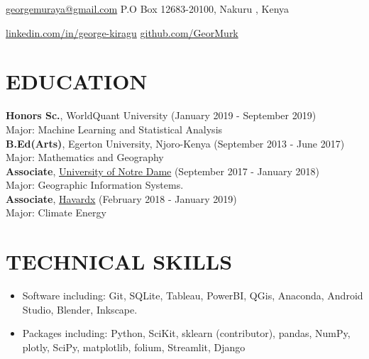 \documentclass[line,margin,10pt]{res}
\begin{document}
 
\begin{resume}
\hoffset\centerline 
{\href{mailto:georgemuraya@gmail.com}{georgemuraya@gmail.com} \quad \quad \quad \quad \quad \quad \quad \quad \quad \quad \quad\quad \quad \quad \quad \quad \quad \quad \quad \quad \quad \quad  \quad    P.O Box 12683-20100, Nakuru , Kenya}
\hoffset\centerline 
{\hspace{0.05cm} \href{https://linkedin.com/in/george-kiragu}{linkedin.com/in/george-kiragu} \quad \quad \quad \quad \quad \quad \quad \quad \quad \quad \quad\quad \quad \quad \quad \quad \quad \quad \quad \quad \quad \quad  \quad \quad \quad  \quad \quad \quad   \quad \href{https://github.com/GeorMurk}{github.com/GeorMurk}}
 
{\vspace{-0.25cm}}

\section{EDUCATION} 
\textbf{Honors Sc.}, WorldQuant University \hfill (January 2019 - September 2019)\\
Major: Machine Learning and Statistical Analysis \\
\textbf{B.Ed(Arts)}, Egerton University, Njoro-Kenya \hfill (September 2013 - June 2017)\\
Major: Mathematics and Geography \\ 
\textbf{Associate}, \href{https://edge.edx.org/courses/course-v1:NotreDame+GIS000+0000/courseware}{University of Notre Dame} \hfill (September 2017 - January 2018)\\
Major: Geographic Information Systems. \\
\textbf{Associate}, \href{https://courses.edx.org/courses/course-v1:HarvardX+SPU29x+3T2016/course/}{Havardx} \hfill (February 2018 - January 2019)\\
Major: Climate Energy \\

\section{TECHNICAL SKILLS} 
\begin{itemize}[leftmargin=-2pt] \itemsep -2pt
\item [] Software including: Git, SQLite, Tableau, PowerBI, QGis, Anaconda, Android Studio, Blender, Inkscape.
\item []Packages including:  Python, SciKit, sklearn (contributor), pandas, NumPy, plotly, SciPy, matplotlib, folium, Streamlit, Django
\end{itemize}
{\vspace{-0.25cm}}


\end{resume}
\end{document}
